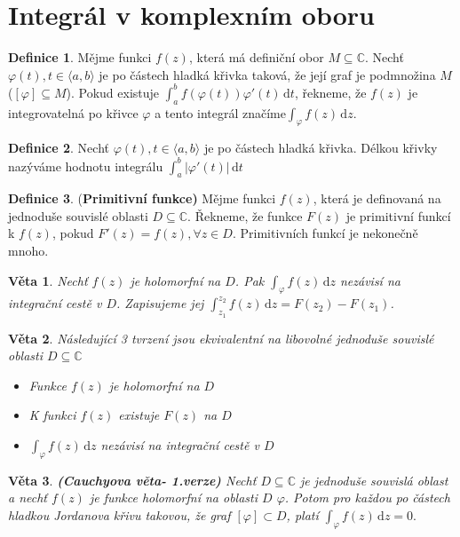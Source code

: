 \documentclass[a4]{report}
\newcommand{\fce}{\text{funkce }}
\newcommand{\dd}{\mathrm{d}}
\newtheorem{theorem}{Věta}
\theoremstyle{definition}
\newtheorem{definition}{Definice}[section]
\begin{document}
\section{Integrál v komplexním oboru}
\begin{definition}
	Mějme funkci $f(z)$, která má definiční obor $M \subseteq \mathbb{C}$. Nechť $\varphi(t), t \in \langle a,b \rangle$ je po částech hladká křivka taková, že její graf je podmnožina $M$ ($[\varphi] \subseteq M$). Pokud existuje $\int_a^b f(\varphi(t))\varphi'(t)\, \mathrm{d} t$, řekneme, že $f(z)$ je integrovatelná po křivce $\varphi$ a tento integrál značíme$\int_{\varphi} f(z)\, \mathrm{d} z$.
\end{definition}

\begin{definition}
	Nechť $\varphi(t), t \in \langle a,b \rangle$ je po částech hladká křivka. Délkou křivky nazýváme hodnotu integrálu $\int_a^b |\varphi'(t)|\, \mathrm{d} t$
 \end{definition}

\begin{definition}
(\textbf{Primitivní funkce)} Mějme funkci $f(z)$, která je definovaná na jednoduše souvislé oblasti $D \subseteq \mathbb{C}$. Řekneme, že funkce $F(z)$ je primitivní funkcí k $f(z)$, pokud $F'(z)=f(z), \forall z \in D$. Primitivních funkcí je nekonečně mnoho.
\end{definition}

\begin{theorem}
	Nechť \fce  $f(z)$ je holomorfní na $D$. Pak $\int_{\varphi}f(z) \, \dd z $ nezávisí na integrační cestě v $D$. Zapisujeme jej $\int_{z_1}^{z_2}f(z) \, \dd z = F(z_2)-F(z_1)$.
\end{theorem}

\begin{theorem}
	Následující 3 tvrzení jsou ekvivalentní na libovolné jednoduše souvislé oblasti $D \subseteq \mathbb{C}$
	\begin{itemize}
		\item Funkce $f(z)$ je holomorfní na $D$
		\item K funkci $f(z)$ existuje $F(z)$ na $D$
		\item $\int_{\varphi} f(z)\,  \dd z$ nezávisí na integrační cestě v $D$ 
	\end{itemize}
\end{theorem}

\begin{theorem}
\textbf{(Cauchyova věta- 1.verze)} Nechť $D \subseteq \mathbb{C} $ je jednoduše souvislá oblast a nechť $f(z)$ je funkce holomorfní na oblasti $D$ $\varphi$. Potom pro každou po částech hladkou Jordanova křivu takovou, že graf $[\varphi]\subset D $,  platí $\int_{\varphi} f(z)\, \dd z = 0.$
\end{theorem}
\end{document}
